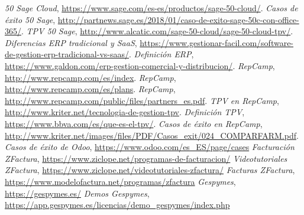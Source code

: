 \documentclass{article}
\begin{document}
\begin{thebibliography}{9}

 \textit{50 Sage Cloud}, \url{https://www.sage.com/es-es/productos/sage-50-cloud/}.
 \textit{Casos de éxito 50 Sage}, \url{http://partnews.sage.es/2018/01/caso-de-exito-sage-50c-con-office-365/}.
 \textit{TPV 50 Sage}, \url{http://www.alcatic.com/sage-50-cloud/sage-50-cloud-tpv/}.
 \textit{Diferencias ERP tradicional y SaaS}, \url{https://www.gestionar-facil.com/software-de-gestion-erp-tradicional-vs-saas/}.
 \textit{Definición ERP}, \url{https://www.galdon.com/erp-gestion-comercial-y-distribucion/}.
 \textit{RepCamp}, \url{http://www.repcamp.com/es/index}.
 \textit{RepCamp}, \url{http://www.repcamp.com/es/plans}.
 \textit{RepCamp}, \url{http://www.repcamp.com/public/files/partners_es.pdf}.
 \textit{TPV en RepCamp}, \url{http://www.kriter.net/tecnologia-de-gestion-tpv}.
 \textit{Definición TPV}, \url{https://www.bbva.com/es/que-es-el-tpv/}.
 \textit{Casos de éxito en RepCamp}, \url{http://www.kriter.net/images/files/PDF/Casos_exit/024_COMPARFARM.pdf}.
 \textit{Casos de éxito de Odoo}, \url{https://www.odoo.com/es_ES/page/cases}
 \textit{Facturación ZFactura}, \url{https://www.ziclope.net/programas-de-facturacion/}
 \textit{Videotutoriales ZFactura}, \url{https://www.ziclope.net/videotutoriales-zfactura/}
 \textit{Facturas ZFactura}, \url{https://www.modelofactura.net/programas/zfactura}
 \textit{Gespymes}, \url{https://gespymes.es/}
 \textit{Demos Gespymes}, \url{https://app.gespymes.es/licencias/demo_gespymes/index.php}

\end{thebibliography}
\end{document}
